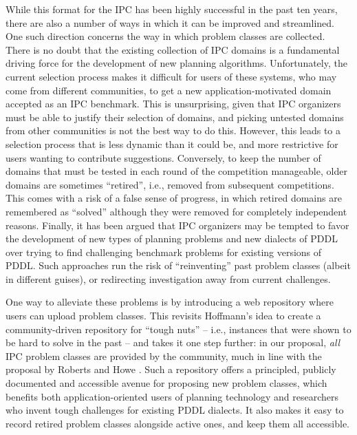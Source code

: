 While this format for the IPC has been highly successful in the past
ten years, there are also a number of ways in which it can be improved
and streamlined.  One such direction concerns the way in which problem
classes are collected.  There is no doubt that the existing collection
of IPC domains is a fundamental driving force for the development of
new planning algorithms.  Unfortunately, the current selection process
makes it difficult for users of these systems, who may come from
different communities, to get a new application-motivated domain
accepted as an IPC benchmark.  This is unsurprising, given that IPC
organizers must be able to justify their selection of domains, and
picking untested domains from other communities is not the best way to
do this.  However, this leads to a selection process that is less
dynamic than it could be, and more restrictive for users wanting to
contribute suggestions.  Conversely, to keep the number of domains
that must be tested in each round of the competition manageable, older
domains are sometimes ``retired'', i.e., removed from subsequent
competitions.  This comes with a risk of a false sense of progress, in
which retired domains are remembered as ``solved'' although they were
removed for completely independent reasons.  Finally, it has been
argued \cite{ToughNuts} that IPC organizers may be tempted to favor
the development of new types of planning problems and new dialects of
PDDL over trying to find challenging benchmark problems for existing
versions of PDDL. Such approaches run the risk of ``reinventing'' past
problem classes (albeit in different guises), or redirecting
investigation away from current challenges.

One way to alleviate these problems is by introducing a web repository
where users can upload problem classes. This revisits Hoffmann's
 idea to create a community-driven repository for
``tough nuts'' -- i.e., instances that were shown to be hard to solve in
the past -- and takes it one step further: in our proposal, \emph{all} IPC
problem classes are provided by the community, much in line with the
proposal by Roberts and Howe . Such a
repository offers a principled, publicly documented and accessible avenue
for proposing new problem classes, which benefits both application-oriented
users of planning technology and researchers who invent tough challenges
for existing PDDL dialects. It also makes it easy to record retired problem
classes alongside active ones, and keep them all accessible.

